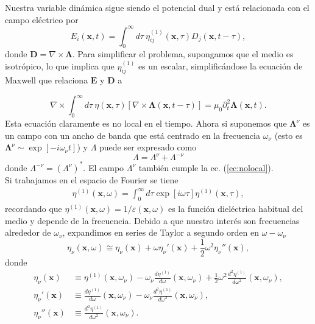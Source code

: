 Nuestra variable din\'{a}mica sigue siendo el potencial dual y est\'{a} relacionada con el campo el\'{e}ctrico por
\begin{equation}
E_i(\textbf{x},t)=\int_0^{\infty}d\tau \ \eta_{ij}^{(1)}(\textbf{x},\tau)D_j(\textbf{x},t-\tau),
\end{equation}
donde $\textbf{D}=\nabla\times\mathbf{\Lambda}$. Para simplificar el problema, supongamos que el medio es isotr\'{o}pico, lo que implica que $\eta_{ij}^{(1)}$ es un escalar, simplific\'{a}ndose la ecuaci\'{o}n de Maxwell que relaciona $\textbf{E}$ y $\textbf{D}$ a	

\begin{equation}\label{ec:nolocal}
\nabla \times \int_0^{\infty} d\tau   \ \eta(\textbf{x},\tau)[\nabla \times \mathbf{\Lambda}(\textbf{x},t-\tau)]=\mu_0\partial_t^2\mathbf{\Lambda}(\textbf{x},t).
\end{equation}
Esta ecuaci\'{o}n claramente es no local en el tiempo. Ahora si suponemos que $ \mathbf{\Lambda}^{\nu}$ es un campo con un ancho de banda que est\'{a} centrado en la frecuencia $\omega_{\nu}$ (esto es $\mathbf{\Lambda}^{\nu}\sim  \exp[-i\omega_{\nu}t]$) y $\Lambda$ puede ser expresado como
\begin{equation}
\Lambda=\Lambda^{\nu}+\Lambda^{-\nu}
\end{equation}
donde $\Lambda^{-\nu}=(\Lambda^{\nu})^*$. El campo $\Lambda^{\nu}$ tambi\'{e}n cumple la ec. (\ref{ec:nolocal}).\\
Si trabajamos en el espacio de Fourier se tiene
\begin{align}
\eta^{(1)}(\textbf{x},\omega)=\int_0^{\infty} d\tau \exp[i\omega \tau]\eta^{(1)}(\textbf{x},\tau),
\end{align}
recordando que $\eta^{(1)}(\textbf{x},\omega)=1/\varepsilon(\textbf{x},\omega)$ es la función dieléctrica habitual del medio y depende de la frecuencia. Debido a que nuestro inter\'{e}s son frecuencias alrededor de $\omega_{\nu}$, expandimos en series de Taylor a segundo orden en $\omega-\omega_{\nu}$ 
\begin{equation}\label{ec:taylor1}
\eta_{\nu}(\textbf{x},\omega)\cong \eta_{\nu}(\textbf{x})+\omega\eta_{\nu}'(\textbf{x})+\frac{1}{2}\omega^2\eta_{\nu}''(\textbf{x}),
\end{equation}
donde
\begin{align}
 \eta_{\nu}(\textbf{x})&\equiv \eta^{(1)}(\textbf{x},\omega_{\nu})-\omega_{\nu}\frac{d\eta^{(1)}}{d\omega}(\textbf{x},\omega_{\nu})+\frac{1}{2}\omega^2\frac{d^2\eta^{(1)}}{d\omega^2}(\textbf{x},\omega_{\nu}),\\
 \eta_{\nu}'(\textbf{x})&\equiv \frac{d\eta^{(1)}}{d\omega}(\textbf{x},\omega_{\nu})-\omega_{\nu}\frac{d^2\eta^{(1)}}{d\omega^2}(\textbf{x},\omega_{\nu}),\\
\eta_{\nu}''(\textbf{x})& \equiv \frac{d^2\eta^{(1)}}{d\omega^2}(\textbf{x},\omega_{\nu}).
\end{align}
